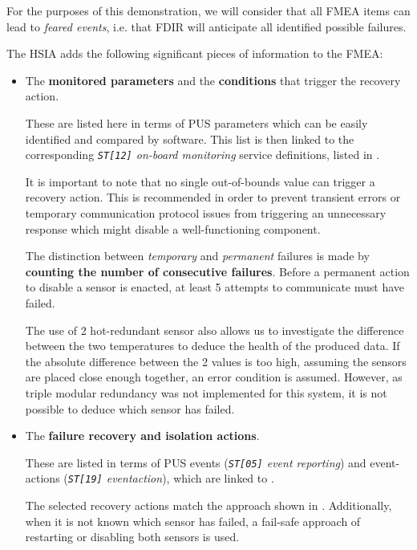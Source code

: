 \documentclass[a4paper,nobib]{tufte-book}
\begin{document}
For the purposes of this demonstration, we will consider that all \ac{FMEA} items can lead to \emph{feared events}, i.e. that \ac{FDIR} will anticipate all identified possible failures.

The \ac{HSIA} adds the following significant pieces of information to the \ac{FMEA}:\autocite{ECSS-Q-ST-30-02C}
\begin{itemize}
	\item The \textbf{monitored parameters} and the \textbf{conditions} that trigger the recovery action.
	
	These are listed here in terms of \ac{PUS} parameters which can be easily identified and compared by software. This list is then linked to the corresponding \emph{\texttt{ST[12]} on-board monitoring} service definitions, listed in .
	
	It is important to note that no single out-of-bounds value can trigger a recovery action. This is recommended in order to prevent transient errors or temporary communication protocol issues from triggering an unnecessary response which might disable a well-functioning component.
	
	The distinction between \emph{temporary} and \emph{permanent} failures is made by \textbf{counting the number of consecutive failures}. Before a permanent action to disable a sensor is enacted, at least 5 attempts to communicate must have failed.
	
	The use of 2 hot-redundant sensor also allows us to investigate the difference between the two temperatures to deduce the health of the produced data. If the absolute difference between the 2 values is too high, assuming the sensors are placed close enough together, an error condition is assumed. However, as triple modular redundancy was not implemented for this system, it is not possible to deduce which sensor has failed.
	
	\item The \textbf{failure recovery and isolation actions}.
	
	These are listed in terms of \ac{PUS} events (\emph{\texttt{ST[05]} event reporting}) and event-actions (\emph{\texttt{ST[19]} eventaction}), which are linked to .
	
	The selected recovery actions match the approach shown in . Additionally, when it is not known which sensor has failed, a fail-safe approach of restarting or disabling both sensors is used.
\end{itemize}
\end{document}
